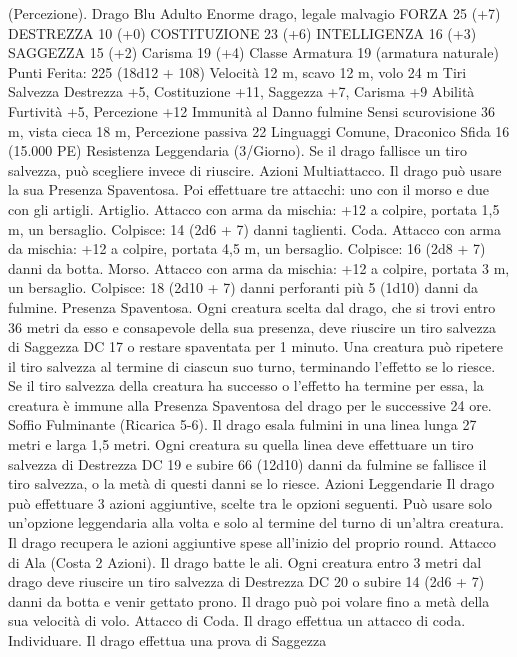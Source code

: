 \begin{multicols}{2}
(Percezione).
Drago Blu Adulto
Enorme drago, legale malvagio
FORZA 25 (+7)
DESTREZZA 10 (+0)
COSTITUZIONE 23 (+6)
INTELLIGENZA 16 (+3)
SAGGEZZA 15 (+2)
Carisma 19 (+4)
Classe Armatura 19 (armatura naturale)
\hspace*{0pt}\hfill{Punti Ferita}: 225 (18d12 + 108)
Velocità 12 m, scavo 12 m, volo 24 m
Tiri Salvezza Destrezza +5, Costituzione +11, Saggezza +7,
Carisma +9
Abilità Furtività +5, Percezione +12
Immunità al Danno fulmine
Sensi scurovisione 36 m, vista cieca 18 m, Percezione passiva 22
Linguaggi Comune, Draconico
Sfida 16 (15.000 PE)
Resistenza Leggendaria (3/Giorno). Se il drago fallisce un tiro
salvezza, può scegliere invece di riuscire.
Azioni
Multiattacco. Il drago può usare la sua Presenza Spaventosa. Poi
effettuare tre attacchi: uno con il morso e due con gli artigli.
Artiglio. Attacco con arma da mischia: +12 a colpire, portata 1,5
m, un bersaglio.
Colpisce: 14 (2d6 + 7) danni taglienti.
Coda. Attacco con arma da mischia: +12 a colpire, portata 4,5
m, un bersaglio.
Colpisce: 16 (2d8 + 7) danni da botta.
Morso. Attacco con arma da mischia: +12 a colpire, portata 3 m,
un bersaglio.
Colpisce: 18 (2d10 + 7) danni perforanti più 5 (1d10) danni da
fulmine.
Presenza Spaventosa. Ogni creatura scelta dal drago, che si trovi
entro 36 metri da esso e consapevole della sua presenza, deve
riuscire un tiro salvezza di Saggezza DC 17 o restare spaventata
per 1 minuto. Una creatura può ripetere il tiro salvezza al termine
di ciascun suo turno, terminando l’effetto se lo riesce. Se il tiro
salvezza della creatura ha successo o l’effetto ha termine per
essa, la creatura è immune alla Presenza Spaventosa del drago
per le successive 24 ore.
Soffio Fulminante (Ricarica 5-6). Il drago esala fulmini in una
linea lunga 27 metri e larga 1,5 metri. Ogni creatura su quella
linea deve effettuare un tiro salvezza di Destrezza DC 19 e subire
66 (12d10) danni da fulmine se fallisce il tiro salvezza, o la metà
di questi danni se lo riesce.
Azioni Leggendarie
Il drago può effettuare 3 azioni aggiuntive, scelte tra le opzioni
seguenti. Può usare solo un’opzione leggendaria alla volta e solo
al termine del turno di un’altra creatura. Il drago recupera le
azioni aggiuntive spese all’inizio del proprio round.
Attacco di Ala (Costa 2 Azioni). Il drago batte le ali. Ogni
creatura entro 3 metri dal drago deve riuscire un tiro salvezza di
Destrezza DC 20 o subire 14 (2d6 + 7) danni da botta e venir
gettato prono. Il drago può poi volare fino a metà della sua
velocità di volo.
Attacco di Coda. Il drago effettua un attacco di coda.
Individuare. Il drago effettua una prova di Saggezza

\end{multicols}
